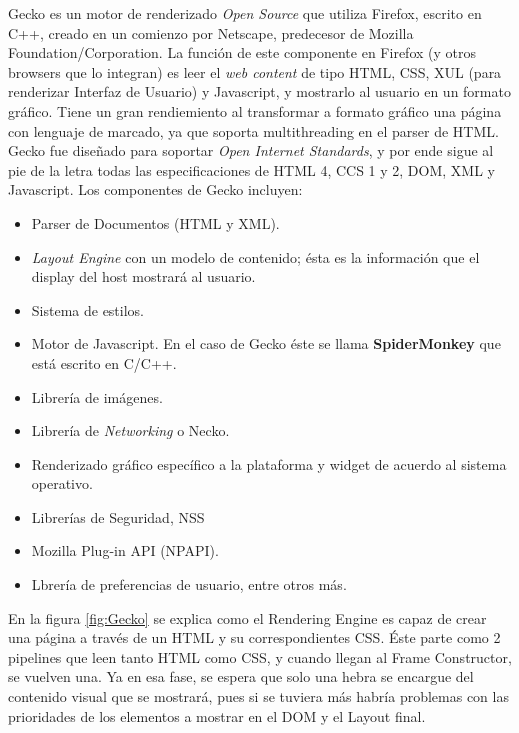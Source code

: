        Gecko es un motor de renderizado \textit{Open Source} que utiliza Firefox, escrito en C++, creado en un comienzo por Netscape, predecesor de Mozilla Foundation/Corporation. La función de este componente en Firefox (y otros browsers que lo integran) es leer el \textit{web content} de tipo HTML, CSS, XUL (para renderizar Interfaz de Usuario) y Javascript, y mostrarlo al usuario en un formato gráfico. Tiene un gran rendiemiento al transformar a formato gráfico una página con lenguaje de marcado, ya que soporta multithreading en el parser de HTML. Gecko fue diseñado para soportar \textit{Open Internet Standards}, y por ende sigue al pie de la letra todas las especificaciones de HTML 4, CCS 1 y 2, DOM, XML y Javascript. Los componentes de Gecko incluyen:
            \begin{itemize}
                \item Parser de Documentos (HTML y XML).
                \item \textit{Layout Engine} con un modelo de contenido; ésta es la información que el display del host mostrará al usuario.
                \item Sistema de estilos.
                \item Motor de Javascript. En el caso de Gecko éste se llama \textbf{SpiderMonkey} que está escrito en C/C++.
                \item Librería de imágenes.
                \item Librería de \textit{Networking} o Necko.
                \item Renderizado gráfico específico a la plataforma y widget de acuerdo al sistema operativo.
                \item Librerías de Seguridad, NSS
                \item Mozilla Plug-in API (NPAPI).
                \item Lbrería de preferencias de usuario, entre otros más.

            \end{itemize}
        En la figura \ref{fig:Gecko} se explica como el Rendering Engine es capaz de crear una página a través de un HTML y su correspondientes CSS. Éste parte como 2 pipelines que leen tanto HTML como CSS, y cuando llegan al Frame Constructor, se vuelven una. Ya en esa fase, se espera que solo una hebra se encargue del contenido visual que se mostrará, pues si se tuviera más habría problemas con las prioridades de los elementos a mostrar en el DOM y el Layout final.

